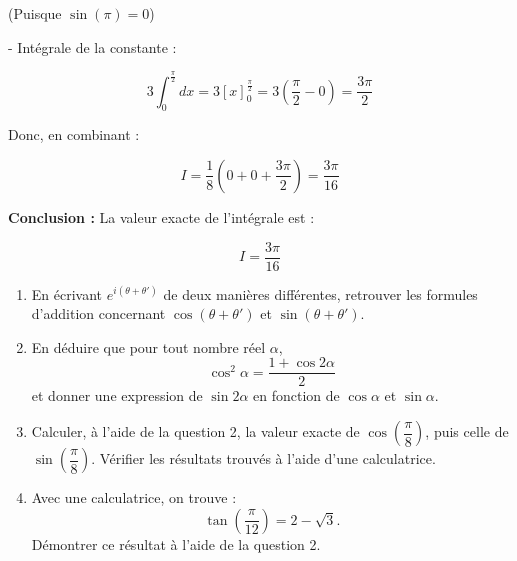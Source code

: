 \documentclass[a4paper,12pt]{article}
\begin{document}
\begin{solutionbox}
\begin{enumerate}
    (Puisque \( \sin(\pi) = 0 \))

    - Intégrale de la constante :

    \[
    3 \int_0^{\frac{\pi}{2}} dx = 3 \left[ x \right]_0^{\frac{\pi}{2}} = 3 \left( \dfrac{\pi}{2} - 0 \right ) = \dfrac{3\pi}{2}
    \]

    Donc, en combinant :

    \[
    I = \dfrac{1}{8} \left( 0 + 0 + \dfrac{3\pi}{2} \right ) = \dfrac{3\pi}{16}
    \]

    \textbf{Conclusion :} La valeur exacte de l'intégrale est :

    \[
    I = \dfrac{3\pi}{16}
    \]

\end{enumerate}
\end{solutionbox}

\begin{tcolorbox}[title={Exercice 24}]
\begin{enumerate}
    \item En écrivant \( e^{i(\theta + \theta')} \) de deux manières différentes, retrouver les formules d'addition concernant \( \cos(\theta + \theta') \) et \( \sin(\theta + \theta') \).
    \item En déduire que pour tout nombre réel \( \alpha \),
       \[
       \cos^2 \alpha = \dfrac{1 + \cos 2\alpha}{2}
       \]
       et donner une expression de \( \sin 2\alpha \) en fonction de \( \cos \alpha \) et \( \sin \alpha \).
    \item Calculer, à l'aide de la question 2, la valeur exacte de \( \cos\left( \dfrac{\pi}{8} \right) \), puis celle de \( \sin\left( \dfrac{\pi}{8} \right) \).  
       Vérifier les résultats trouvés à l'aide d'une calculatrice.
    \item Avec une calculatrice, on trouve :
       \[
       \tan\left( \dfrac{\pi}{12} \right) = 2 - \sqrt{3}.
       \]
       Démontrer ce résultat à l'aide de la question 2.
\end{enumerate}
\end{tcolorbox}
\end{document}
